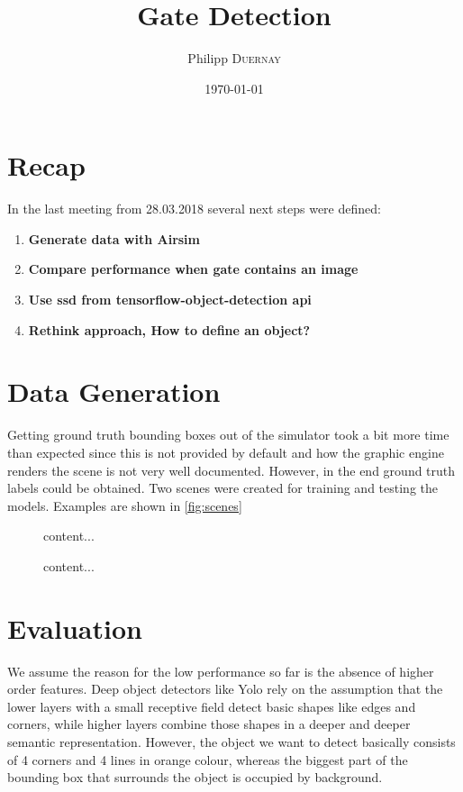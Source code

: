 \documentclass{article}
\title{Gate Detection} %
\author{Philipp \textsc{Duernay}} %
\date{\today} %
\begin{document}
\maketitle


\section{Recap}
In the last meeting from 28.03.2018 several next steps were defined:
\begin{enumerate}
	\item \textbf{Generate data with Airsim}
	\item \textbf{Compare performance when gate contains an image}
	\item \textbf{Use ssd from tensorflow-object-detection api}
	\item \textbf{Rethink approach, How to define an object?}
\end{enumerate}

\section{Data Generation}
Getting ground truth bounding boxes out of the simulator took a bit more time than expected since this is not provided by default and how the graphic engine renders the scene is not very well documented. However, in the end ground truth labels could be obtained. Two scenes were created for training and testing the models. Examples are shown in \autoref{fig:scenes}
\begin{figure}
	\begin{minipage}{0.5\textwidth}
		content...
	\end{minipage}
	\begin{minipage}{0.5\textwidth}
		content...
	\end{minipage}
	\label{fig:scenes}
\end{figure} 

\section{Evaluation}
We assume the reason for the low performance so far is the absence of higher order features. Deep object detectors like Yolo rely on the assumption that the lower layers with a small receptive field detect basic shapes like edges and corners, while higher layers combine those shapes in a deeper and deeper semantic representation. However, the object we want to detect basically consists of 4 corners and 4 lines in orange colour, whereas the biggest part of the bounding box that surrounds the object is occupied by background. 
\end{document}
